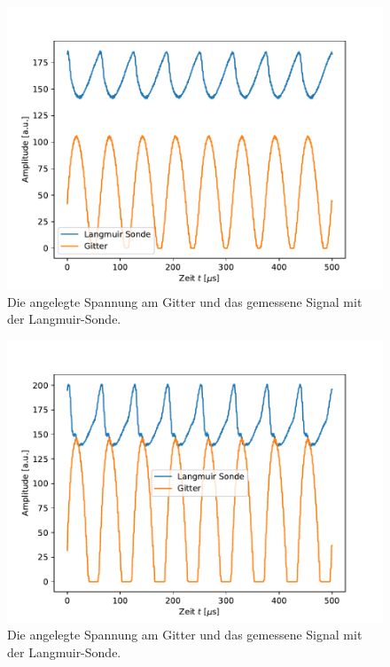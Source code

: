\begin{figure}[H]
\centering
\includegraphics[scale=0.6]{oszi_1.pdf}
\caption{Die angelegte Spannung am Gitter und das gemessene Signal mit der Langmuir-Sonde.}
\label{fig:oszi_1}
\end{figure}



\begin{figure}[H]
\centering
\includegraphics[scale=0.6]{oszi_3.pdf}
\caption{Die angelegte Spannung am Gitter und das gemessene Signal mit der Langmuir-Sonde.}
\label{fig:oszi_3}
\end{figure}
